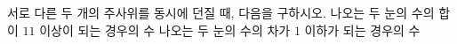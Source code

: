 서로 다른 두 개의 주사위를 동시에 던질 때, 다음을 구하시오.
 나오는 두 눈의 수의 합이 $11$ 이상이 되는 경우의 수
 나오는 두 눈의 수의 차가 $1$ 이하가 되는 경우의 수
